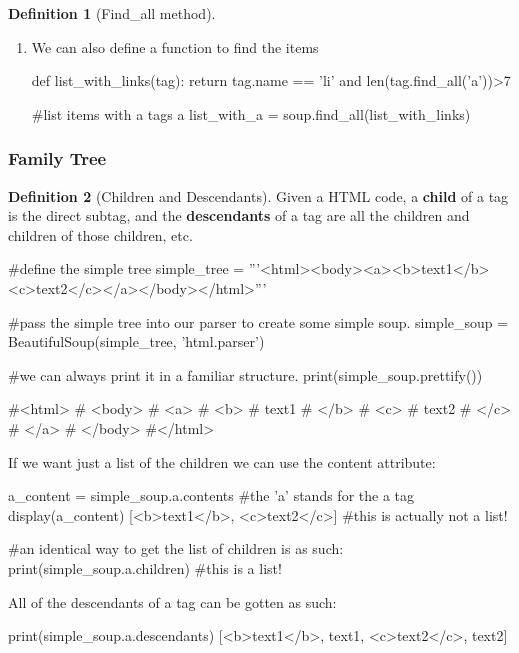 \documentclass[a4paper, 12pt]{report}
\theoremstyle{remark}
\theoremstyle{definition}
\newtheorem{definition}{Definition}[section]
\begin{document}
\begin{definition}[Find\_all method]
\begin{enumerate}
    \item We can also define a function to find the items
    \begin{python}
    def list_with_links(tag): 
        return tag.name == 'li' and len(tag.find_all('a'))>7
        
    #list items with a tags a
    list_with_a = soup.find_all(list_with_links)
    \end{python}
\end{enumerate}
\end{definition}

\subsubsection{Family Tree}
\begin{definition}[Children and Descendants]
Given a HTML code, a \textbf{child} of a tag is the direct subtag, and the \textbf{descendants} of a tag are all the children and children of those children, etc. 
\begin{python}
#define the simple tree
simple_tree = 
'''<html><body><a><b>text1</b><c>text2</c></a></body></html>'''

#pass the simple tree into our parser to create some simple soup. 
simple_soup = BeautifulSoup(simple_tree, 'html.parser')

#we can always print it in a familiar structure. 
print(simple_soup.prettify())

#<html>
# <body>
#  <a>
#   <b>
#    text1
#   </b>
#   <c>
#    text2
#   </c>
#  </a>
# </body>
#</html>
\end{python}
If we want just a list of the children we can use the content attribute:
\begin{python}
a_content = simple_soup.a.contents  #the 'a' stands for the a tag
display(a_content)
[<b>text1</b>, <c>text2</c>]  #this is actually not a list!

#an identical way to get the list of children is as such:
print(simple_soup.a.children) #this is a list!
\end{python}
All of the descendants of a tag can be gotten as such: 
\begin{python}
print(simple_soup.a.descendants)
[<b>text1</b>, text1, <c>text2</c>, text2]
\end{python}
\end{definition}
\end{document}

